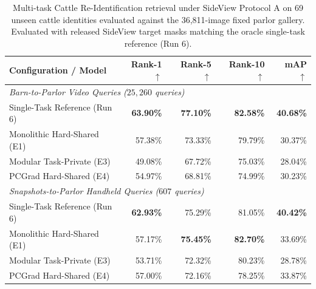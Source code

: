 \begin{table}[htbp]
\centering\small
\caption[Multi-task Cattle Re-Identification results under SideView Protocol A]{Multi-task Cattle Re-Identification retrieval under SideView Protocol A on 69 unseen cattle identities evaluated against the 36,811-image fixed parlor gallery. Evaluated with released SideView target masks matching the oracle single-task reference (Run 6).}
\label{tab:mtl_reid_results}
\begin{tabular}{lrrrr}
\toprule
\textbf{Configuration / Model} & \textbf{Rank-1} $\uparrow$ & \textbf{Rank-5} $\uparrow$ & \textbf{Rank-10} $\uparrow$ & \textbf{mAP} $\uparrow$ \\
\midrule
\multicolumn{5}{l}{\textit{Barn-to-Parlor Video Queries ($25{,}260$ queries)}} \\
\midrule
Single-Task Reference (Run 6) & \textbf{63.90\%} & \textbf{77.10\%} & \textbf{82.58\%} & \textbf{40.68\%} \\
Monolithic Hard-Shared (E1) & 57.38\% & 73.33\% & 79.79\% & 30.37\% \\
Modular Task-Private (E3) & 49.08\% & 67.72\% & 75.03\% & 28.04\% \\
PCGrad Hard-Shared (E4) & 54.97\% & 68.81\% & 74.99\% & 30.23\% \\
\midrule
\multicolumn{5}{l}{\textit{Snapshots-to-Parlor Handheld Queries ($607$ queries)}} \\
\midrule
Single-Task Reference (Run 6) & \textbf{62.93\%} & 75.29\% & 81.05\% & \textbf{40.42\%} \\
Monolithic Hard-Shared (E1) & 57.17\% & \textbf{75.45\%} & \textbf{82.70\%} & 33.69\% \\
Modular Task-Private (E3) & 53.71\% & 72.32\% & 80.23\% & 28.78\% \\
PCGrad Hard-Shared (E4) & 57.00\% & 72.16\% & 78.25\% & 33.87\% \\
\bottomrule
\end{tabular}
\end{table}
